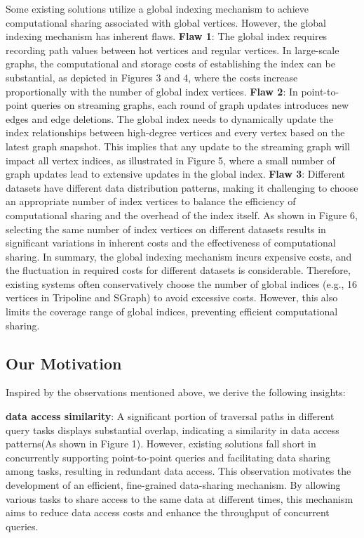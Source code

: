 \documentclass[lettersize,journal]{IEEEtran} %
\begin{document}
Some existing solutions utilize a global indexing mechanism\cite{tripoline}\cite{sgraph} to achieve computational sharing associated with global vertices. However, the global indexing mechanism has inherent flaws. {\bf{Flaw 1}}: The global index requires recording path values between hot vertices and regular vertices. In large-scale graphs, the computational and storage costs of establishing the index can be substantial, as depicted in Figures 3 and 4, where the costs increase proportionally with the number of global index vertices. {\bf{Flaw 2}}: In point-to-point queries on streaming graphs, each round of graph updates introduces new edges and edge deletions. The global index needs to dynamically update the index relationships between high-degree vertices and every vertex based on the latest graph snapshot. This implies that any update to the streaming graph will impact all vertex indices, as illustrated in Figure 5, where a small number of graph updates lead to extensive updates in the global index. {\bf{Flaw 3}}: Different datasets have different data distribution patterns, making it challenging to choose an appropriate number of index vertices to balance the efficiency of computational sharing and the overhead of the index itself. As shown in Figure 6, selecting the same number of index vertices on different datasets results in significant variations in inherent costs and the effectiveness of computational sharing. In summary, the global indexing mechanism incurs expensive costs, and the fluctuation in required costs for different datasets is considerable. Therefore, existing systems often conservatively choose the number of global indices (e.g., 16 vertices in Tripoline\cite{tripoline} and SGraph\cite{sgraph}) to avoid excessive costs. However, this also limits the coverage range of global indices, preventing efficient computational sharing.


\subsection{Our Motivation}
Inspired by the observations mentioned above, we derive the following insights:

{\bf{data access similarity}}: A significant portion of traversal paths in different query tasks displays substantial overlap, indicating a similarity in data access patterns(As shown in Figure 1). However, existing solutions fall short in concurrently supporting point-to-point queries and facilitating data sharing among tasks, resulting in redundant data access. This observation motivates the development of an efficient, fine-grained data-sharing mechanism. By allowing various tasks to share access to the same data at different times, this mechanism aims to reduce data access costs and enhance the throughput of concurrent queries.
\end{document}
